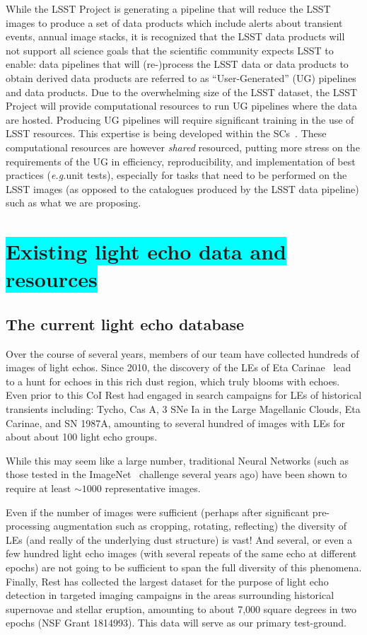 \documentclass{proposalnsf}
\newcommand{\armin}[1]{\colorbox{cyan}{#1}}
\newcommand{\eg}{\emph{e.g.}}
\begin{document}
While the LSST Project is generating a pipeline that will reduce the LSST images to produce a set of data products which include alerts about transient events, annual image stacks, it is recognized that the LSST data products will not support all science goals that the scientific community expects LSST to enable:  data pipelines that will (re-)process the LSST data or data products to obtain derived data products are referred to as “User-Generated” (UG) pipelines and data products. Due to the overwhelming size of the LSST dataset, the LSST Project will provide computational resources to run UG pipelines where the data are hosted. Producing UG pipelines will require significant training in the use of  LSST resources. This expertise is being developed within the SCs~\citep{bianco2019better}. These computational resources are however \emph{shared} resourced, putting more stress on the requirements of the UG in efficiency, reproducibility, and implementation of best practices (\eg unit tests), especially for tasks that need to be performed on the LSST images (as opposed to the catalogues produced by the LSST data pipeline) such as what we are proposing.




\section{\armin{Existing light echo data and resources}}\label{realdata}
\subsection{The current light echo database}
Over the course of several years, members of our team have collected hundreds of images of light echos.  Since 2010, the discovery of the LEs of Eta Carinae~\citep{Rest2019} lead to a hunt for echoes in this rich dust region, which truly blooms with echoes.  Even prior to this CoI Rest had engaged in search campaigns for LEs of historical transients including: Tycho, Cas A, 3 SNe Ia in the Large Magellanic Clouds, Eta Carinae, and SN 1987A, amounting to several hundred of images with LEs for about about 100 light echo groups.   

While this may seem like a large number, traditional Neural Networks (such as those tested in the ImageNet~ challenge several years ago) have been shown to require at least $\sim 1000$ representative images.

Even if the number of images were sufficient (perhaps after significant pre-processing augmentation such as cropping, rotating, reflecting) the diversity of LEs (and really of the underlying dust structure) is vast! And several, or even a few hundred light echo images (with several repeats of the same echo at different epochs) are not going to be sufficient to span the full diversity of this phenomena.  
Finally, Rest has collected the largest dataset for the purpose of light echo detection in targeted imaging campaigns in the areas surrounding historical supernovae and stellar eruption, amounting to about 7,000 square degrees in two epochs (NSF Grant 1814993). This data will serve as our primary test-ground.
\end{document}

